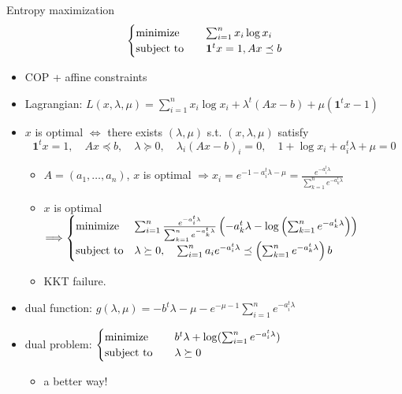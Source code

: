 \begin{remark}
    Entropy maximization\[\begin{cases}
        \operatorname{minimize} \quad &\sum_{i = 1}^nx_i\log x_i\\
        \operatorname{subject\ to} \quad &\mathbf{1}^tx = 1, Ax \preceq b
    \end{cases}\]
    \begin{itemize}
        \item COP + affine constraints
        \item Lagrangian: $L(x, \lambda, \mu) = \sum_{i = 1}^nx_i\log x_i + \lambda^t(Ax - b) + \mu(\mathbf{1}^tx - 1)$
        \item $x$ is optimal $\Longleftrightarrow$ there exists $(\lambda, \mu)$ s.t. $(x, \lambda, \mu)$ satisfy\[\mathbf{1}^{t} x=1, \quad A x \preceq b, \quad \lambda \succeq 0, \quad \lambda_{i}(A x-b)_{i}=0, \quad 1+\log x_{i}+a_{i}^{t} \lambda+\mu=0\]\begin{itemize}
            \item $A = (a_1, \dots, a_n)$, $x$ is optimal $\Longrightarrow x_i = e^{-1 - a_i^t\lambda - \mu} = \frac{e^{-a_i^t\lambda}}{\sum_{k = 1}^ne^{-a_k^t\lambda}}$
            \item $x$ is optimal $\Longrightarrow \begin{cases}
                \operatorname{minimize} &\sum_{i=1}^{n} \frac{e^{-a_{i}^{t} \lambda}}{\sum_{k=1}^{n} e^{-a_{k}^{t} \lambda}}\left(-a_{k}^{t} \lambda-\log \left(\sum_{k=1}^{n} e^{-a_{k}^{t} \lambda}\right)\right) \\
                \operatorname{subject\ to} &\lambda \succeq 0, \quad \sum_{i=1}^{n} a_{i} e^{-a_{i}^{t} \lambda} \preceq\left(\sum_{k=1}^{n} e^{-a_{k}^{t} \lambda}\right) b
            \end{cases}$
            \item KKT failure.
        \end{itemize}
        \item dual function: $g(\lambda, \mu) = -b^t\lambda - \mu - e^{-\mu - 1}\sum_{i = 1}^ne^{-a_i^t\lambda}$
        \item dual problem: $\begin{cases}
            \operatorname{minimize} \quad &b^t\lambda + \log(\sum_{i = 1}^ne^{-a_i^t\lambda})\\
            \operatorname{subject\ to} \quad &\lambda\succeq 0
        \end{cases}$\begin{itemize}
            \item a better way!
        \end{itemize}
    \end{itemize}
\end{remark}

